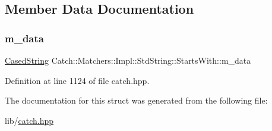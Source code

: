\subsection{Member Data Documentation}
\hypertarget{struct_catch_1_1_matchers_1_1_impl_1_1_std_string_1_1_starts_with_accaace83106244c635d251addb028125}{}\label{struct_catch_1_1_matchers_1_1_impl_1_1_std_string_1_1_starts_with_accaace83106244c635d251addb028125} 
\subsubsection{\texorpdfstring{m\+\_\+data}{m\_data}}
{\footnotesize\ttfamily \hyperlink{struct_catch_1_1_matchers_1_1_impl_1_1_std_string_1_1_cased_string}{Cased\+String} Catch\+::\+Matchers\+::\+Impl\+::\+Std\+String\+::\+Starts\+With\+::m\+\_\+data}



Definition at line 1124 of file catch.\+hpp.



The documentation for this struct was generated from the following file\+:\begin{DoxyCompactItemize}
\item 
lib/\hyperlink{catch_8hpp}{catch.\+hpp}\end{DoxyCompactItemize}
